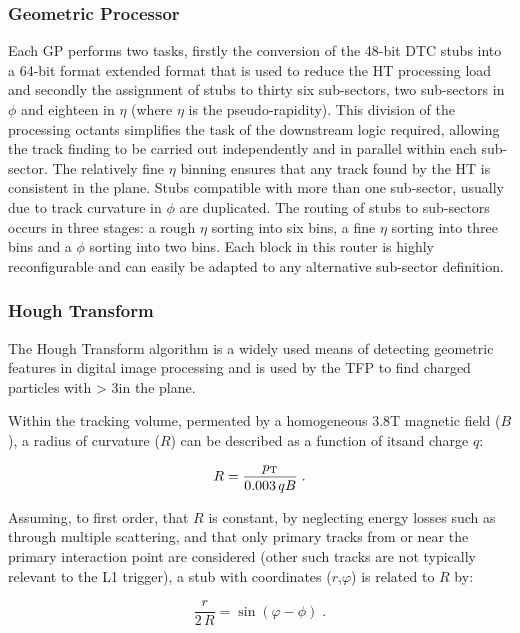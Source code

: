 \subsubsection{Geometric Processor}\label{subsubsec:GP}
Each GP performs two tasks, firstly the conversion of the 48-bit DTC stubs into a 64-bit format extended format that is used to reduce the HT processing load and secondly the assignment of stubs to thirty six sub-sectors, two sub-sectors in $\phi$ and eighteen in $\eta$ (where $\eta$ is the pseudo-rapidity). 
This division of the processing octants simplifies the task of the downstream logic required, allowing the track finding to be carried out independently and in parallel within each sub-sector. 
The relatively fine $\eta$ binning ensures that any track found by the \rphi HT is consistent in the \rz plane. Stubs compatible with more than one sub-sector, usually due to track curvature in $\phi$ are duplicated. 
The routing of stubs to sub-sectors occurs in three stages: a rough $\eta$ sorting into six bins, a fine $\eta$ sorting into three bins and a $\phi$ sorting into two bins. 
Each block in this router is highly reconfigurable and can easily be adapted to any alternative sub-sector definition.

\subsubsection{Hough Transform}
The Hough Transform algorithm is a widely used means of detecting geometric features in digital image processing \cite{HT} and is used by the TFP to find charged particles with \pT > 3\GeV in the \rphi plane. 

Within the tracking volume, permeated by a homogeneous 3.8T magnetic field ($B$), a radius of curvature ($R$) can be described as a function of its\pT and charge $q$:

\begin{equation}
R = \frac{p_{\mathrm{T}}}{0.003\,qB} \;.
\label{eq:R}
\end{equation}

Assuming, to first order, that $R$ is constant, by neglecting energy losses such as through multiple scattering, and that only primary tracks from or near the primary interaction point are considered (other such tracks are not typically relevant to the L1 trigger), a stub with coordinates ($r$,$\varphi$) is related to $R$ by:

\begin{equation}
\frac r{2\,R} = \sin\left(\varphi-\phi\right) \;.
\label{eq:stub_R}
\end{equation}

